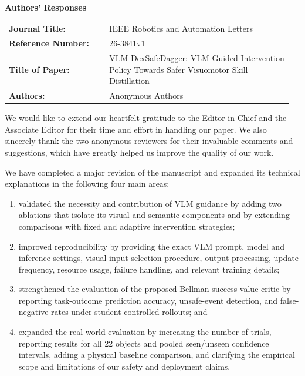 \documentclass[12pt]{article}
\newcommand{\manuscriptid}{26-3841v1}
\newcommand{\papertitle}{VLM-DexSafeDagger: VLM-Guided Intervention Policy Towards Safer Visuomotor Skill Distillation}
\newcounter{reviewer}
\begin{document}
\begingroup

\begin{center}
  {\Large\bfseries Authors' Responses}\par
\end{center}

\vspace{2em}
\begin{tabular}{@{}p{0.34\linewidth}p{0.62\linewidth}@{}}
\textbf{Journal Title:} & IEEE Robotics and Automation Letters \\
\textbf{Reference Number:} & \manuscriptid \\
\textbf{Title of Paper:} & \papertitle \\
\textbf{Authors:} & Anonymous Authors
\end{tabular}

\vspace{2em}
We would like to extend our heartfelt gratitude to the Editor-in-Chief and the
Associate Editor for their time and effort in handling our paper. We also
sincerely thank the two anonymous reviewers for their invaluable comments and
suggestions, which have greatly helped us improve the quality of our work.

We have completed a major revision of the manuscript and expanded its technical
explanations in the following four main areas:
\begin{enumerate}[label=\arabic*)]
  \item validated the necessity and contribution of VLM guidance by adding two
  ablations that isolate its visual and semantic components and by extending
  comparisons with fixed and adaptive intervention strategies;
  \item improved reproducibility by providing the exact VLM prompt, model and
  inference settings, visual-input selection procedure, output processing,
  update frequency, resource usage, failure handling, and relevant training
  details;
  \item strengthened the evaluation of the proposed Bellman success-value
  critic by reporting task-outcome prediction accuracy, unsafe-event detection,
  and false-negative rates under student-controlled rollouts; and
  \item expanded the real-world evaluation by increasing the number of trials,
  reporting results for all 22 objects and pooled seen/unseen confidence
  intervals, adding a
  physical baseline comparison, and clarifying the empirical scope and
  limitations of our safety and deployment claims.
\end{enumerate}
\end{document}
